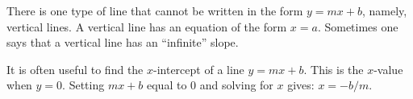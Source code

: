 
There is one type of line that cannot be written in the form $y=mx+b$,
namely, vertical lines.  A vertical line has an equation of the form $x=a$.
Sometimes one says that a vertical line has an ``infinite'' slope.

It is often useful to find the $x$-intercept of a line $y=mx+b$.  This is
the $x$-value when $y=0$.  Setting $mx+b$ equal to 0 and solving for
$x$ gives: $x=-b/m$.  \\

